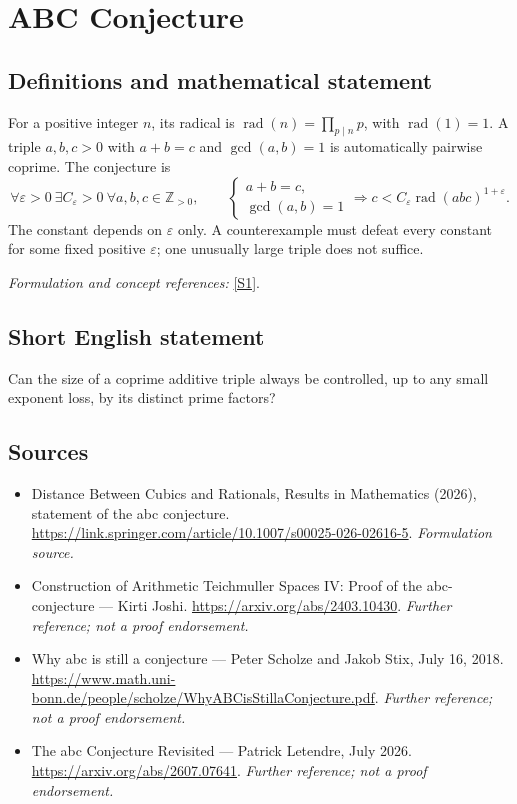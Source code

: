 \documentclass[11pt]{article}
\begin{document}
\section*{\texorpdfstring{ABC Conjecture}{ABC Conjecture}}\label{13}
\subsection{Definitions and mathematical statement}
For a positive integer $n$, its radical is $\operatorname{rad}(n)=\prod_{p\mid n}p$, with $\operatorname{rad}(1)=1$. A triple $a,b,c>0$ with $a+b=c$ and $\gcd(a,b)=1$ is automatically pairwise coprime. The conjecture is
\[
 \forall\varepsilon>0\ \exists C_\varepsilon>0\ \forall a,b,c\in{\mathbb{Z}}_{>0},\qquad
 \begin{cases}a+b=c,\\\gcd(a,b)=1\end{cases}
 \Longrightarrow c<C_\varepsilon\operatorname{rad}(abc)^{1+\varepsilon}.
\]
The constant depends on $\varepsilon$ only. A counterexample must defeat every constant for some fixed positive $\varepsilon$; one unusually large triple does not suffice.
\par\smallskip\textit{Formulation and concept references:} \href{https://link.springer.com/article/10.1007/s00025-026-02616-5}{[S1]}.

\subsection{Short English statement}
Can the size of a coprime additive triple always be controlled, up to any small exponent loss, by its distinct prime factors?
\subsection{Sources}
\begin{itemize}
\item[S1]Distance Between Cubics and Rationals, Results in Mathematics (2026), statement of the abc conjecture.
\url{https://link.springer.com/article/10.1007/s00025-026-02616-5}.
\textit{Formulation source.}
\item[S2]Construction of Arithmetic Teichmuller Spaces IV: Proof of the abc-conjecture — Kirti Joshi.
\url{https://arxiv.org/abs/2403.10430}.
\textit{Further reference; not a proof endorsement.}
\item[S3]Why abc is still a conjecture — Peter Scholze and Jakob Stix, July 16, 2018.
\url{https://www.math.uni-bonn.de/people/scholze/WhyABCisStillaConjecture.pdf}.
\textit{Further reference; not a proof endorsement.}
\item[S4]The abc Conjecture Revisited — Patrick Letendre, July 2026.
\url{https://arxiv.org/abs/2607.07641}.
\textit{Further reference; not a proof endorsement.}
\end{itemize}
\end{document}
